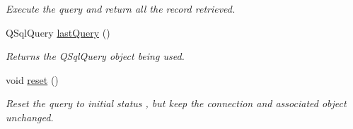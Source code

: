 \begin{DoxyCompactItemize}
\begin{DoxyCompactList}\small\item\em Execute the query and return all the record retrieved. \item\end{DoxyCompactList}\item 
\hypertarget{classDQSharedQuery_af0ef4297145b4e4848a88ed0deddcdc9}{
QSqlQuery \hyperlink{classDQSharedQuery_af0ef4297145b4e4848a88ed0deddcdc9}{lastQuery} ()}
\label{classDQSharedQuery_af0ef4297145b4e4848a88ed0deddcdc9}

\begin{DoxyCompactList}\small\item\em Returns the QSqlQuery object being used. \item\end{DoxyCompactList}\item 
\hypertarget{classDQSharedQuery_a832dba063797f053dbef29ae8c90c804}{
void \hyperlink{classDQSharedQuery_a832dba063797f053dbef29ae8c90c804}{reset} ()}
\label{classDQSharedQuery_a832dba063797f053dbef29ae8c90c804}

\begin{DoxyCompactList}\small\item\em Reset the query to initial status , but keep the connection and associated object unchanged. \item\end{DoxyCompactList}\end{DoxyCompactItemize}
